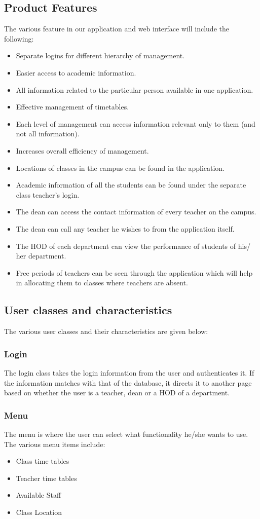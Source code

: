\documentclass[BTech]{srmuthesis}
\begin{document}
\subsection{Product Features}
The various feature in our application and web interface will include the following:
\begin{itemize}
\item Separate logins for different hierarchy of management.
\item Easier access to academic information.
\item All information related to the particular person available in one application.
\item Effective management of timetables.
\item Each level of management can access information relevant only to them (and not all information).
\item Increases overall efficiency of management.
\item Locations of classes in the campus can be found in the application.
\item Academic information of all the students can be found under the separate class teacher's login.
\item The dean can access the contact information of every teacher on the campus.
\item The dean can call any teacher he wishes to from the application itself.
\item The HOD of each department can view the performance of students of his/ her department.
\item Free periods of teachers can be seen through the application which will help in allocating them to classes where teachers are absent.
\end{itemize}
\subsection{User classes and characteristics}
The various user classes and their characteristics are given below:

\subsubsection{Login}
The login class takes the login information from the user and authenticates it. If the information matches with that of the database, it directs it to another page based on whether the user is a teacher, dean or a HOD of a department.                          
\subsubsection{Menu}
The menu is where the user can select what functionality he/she wants to use. The various menu items include:
\begin{itemize}
\item Class time tables
\item Teacher time tables
\item Available Staff
\item Class Location
\end{itemize}
\end{document}

